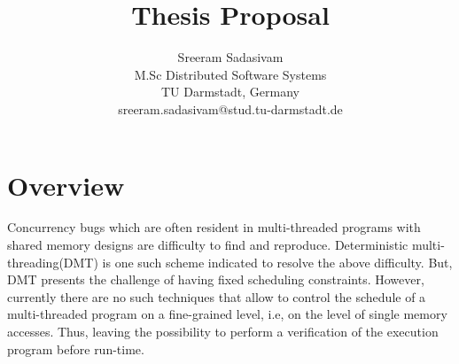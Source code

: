 \documentclass[12pt]{article}
\newcommand{\TODO}[1]{\todo[inline]{#1}}
\begin{document}
\title{\vspace{-3.5cm} Thesis Proposal}


\author{
		 Sreeram Sadasivam\\
		M.Sc Distributed Software Systems\\
		TU Darmstadt, Germany\\
		sreeram.sadasivam@stud.tu-darmstadt.de
}

\date{}


\maketitle





\section*{Overview}

Concurrency bugs which are often resident in multi-threaded programs with shared memory designs are difficulty to find and reproduce. 
Deterministic multi-threading(DMT) is one such scheme indicated to resolve the above difficulty. 
But, DMT presents the challenge of having fixed scheduling constraints.  
However, currently there are no such techniques that allow to control the schedule of a multi-threaded program on a fine-grained level, i.e, on the level of single memory accesses. 
Thus, leaving the possibility to perform a verification of the execution program before run-time. 
\end{document}
